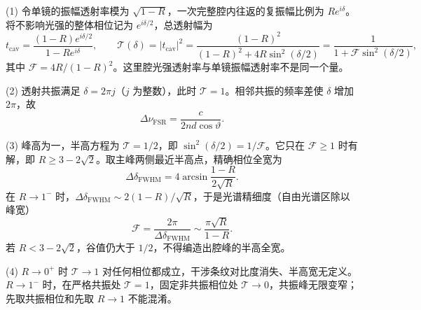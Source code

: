 (1) 令单镜的振幅透射率模为 \(\sqrt{1-R}\)，一次完整腔内往返的复振幅比例为 \(Re^{i\delta}\)。将不影响光强的整体相位记为 \(e^{i\delta/2}\)，总透射幅为
\[
t_{\mathrm{cav}}=\frac{(1-R)e^{i\delta/2}}{1-Re^{i\delta}},\qquad
\mathcal T(\delta)=|t_{\mathrm{cav}}|^2=\frac{(1-R)^2}{(1-R)^2+4R\sin^2(\delta/2)}
=\frac1{1+\mathcal F\sin^2(\delta/2)},
\]
其中 \(\mathcal F=4R/(1-R)^2\)。这里腔光强透射率与单镜振幅透射率不是同一个量。

(2) 透射共振满足 \(\delta=2\pi j\)（\(j\) 为整数），此时 \(\mathcal T=1\)。相邻共振的频率差使 \(\delta\) 增加 \(2\pi\)，故
\[
\Delta\nu_{\mathrm{FSR}}=\frac{c}{2nd\cos\vartheta}.
\]

(3) 峰高为一，半高方程为 \(\mathcal T=1/2\)，即 \(\sin^2(\delta/2)=1/\mathcal F\)。它只在 \(\mathcal F\ge1\) 时有解，即 \(R\ge3-2\sqrt2\)。取主峰两侧最近半高点，精确相位全宽为
\[
\Delta\delta_{\mathrm{FWHM}}=4\arcsin\frac{1-R}{2\sqrt R}.
\]
在 \(R\to1^-\) 时，\(\Delta\delta_{\mathrm{FWHM}}\sim 2(1-R)/\sqrt R\)，于是光谱精细度（自由光谱区除以峰宽）
\[
\mathscr{F}=\frac{2\pi}{\Delta\delta_{\mathrm{FWHM}}}\sim\frac{\pi\sqrt R}{1-R}.
\]
若 \(R<3-2\sqrt2\)，谷值仍大于 \(1/2\)，不得编造出腔峰的半高全宽。

(4) \(R\to0^+\) 时 \(\mathcal T\to1\) 对任何相位都成立，干涉条纹对比度消失、半高宽无定义。\(R\to1^-\) 时，在严格共振处 \(\mathcal T=1\)，固定非共振相位处 \(\mathcal T\to0\)，共振峰无限变窄；先取共振相位和先取 \(R\to1\) 不能混淆。
